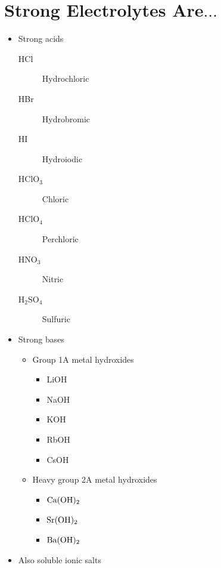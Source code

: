 \documentclass[
	chapter=4
]{chem122notes}
\begin{document}
\section{Strong Electrolytes Are$\dots$}\label{sec:strong-electrolytes-are}
\begin{itemize}
	\item Strong acids
	\begin{description}
		\item[HCl] Hydrochloric
		\item[HBr] Hydrobromic
		\item[HI] Hydroiodic
		\item[HCl$\mbox{O}_{3}$] Chloric
		\item[HCl$\mbox{O}_{4}$] Perchloric
		\item[HN$\mbox{O}_{3}$] Nitric
		\item[$\mbox{H}_{2}\mbox{SO}_{4}$] Sulfuric
	\end{description}
	\item Strong bases
	\begin{itemize}
		\item Group 1A metal hydroxides
		\begin{itemize}
			\item LiOH
			\item NaOH
			\item KOH
			\item RbOH
			\item CsOH
		\end{itemize}
		\item Heavy group 2A metal hydroxides
		\begin{itemize}
			\item $\element{Ca}(\element{OH})_{2}$
			\item $\element{Sr}(\element{OH})_{2}$
			\item $\element{Ba}(\element{OH})_{2}$
		\end{itemize}
	\end{itemize}
	\item Also soluble ionic salts
\end{itemize}
\end{document}

